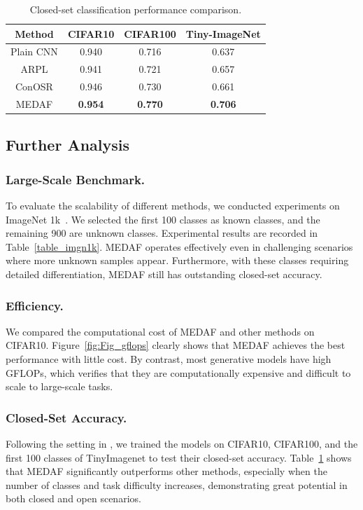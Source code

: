 \documentclass[letterpaper]{article} %
\begin{document}
\begin{table}[t]
\centering
\small
\begin{tabular}{cccc}
\hline
Method & CIFAR10 & CIFAR100 & Tiny-ImageNet \\ \hline
Plain CNN & 0.940 & 0.716 & 0.637 \\
ARPL & 0.941 & 0.721 & 0.657  \\
ConOSR & 0.946 & 0.730 & 0.661 \\  \hline
MEDAF & \textbf{0.954} & \textbf{0.770} & \textbf{0.706}\\ \hline
\end{tabular}
\caption{Closed-set classification performance comparison.}
\label{table_close_acc}
\end{table}

\subsection{Further Analysis}
\subsubsection{Large-Scale Benchmark.}
To evaluate the scalability of different methods, we conducted experiments on ImageNet 1k~\cite{russakovsky2015imagenet}. We selected the first 100 classes as known classes, and the remaining 900 are unknown classes. Experimental results are recorded in Table~\ref{table_imgn1k}. MEDAF operates effectively even in challenging scenarios where more unknown samples appear. Furthermore, with these classes requiring detailed differentiation, MEDAF still has outstanding closed-set accuracy.

\subsubsection{Efficiency.}
We compared the computational cost of MEDAF and other methods on CIFAR10. Figure~\ref{fig:Fig_gflops} clearly shows that MEDAF achieves the best performance with little cost. By contrast, most generative models have high GFLOPs, which verifies that they are computationally expensive and difficult to scale to large-scale tasks.

\subsubsection{Closed-Set Accuracy.}
Following the setting in \cite{xu2023contrastive}, we trained the models on CIFAR10, CIFAR100, and the first 100 classes of TinyImagenet to test their closed-set accuracy. Table~\ref{table_close_acc} shows that MEDAF significantly outperforms other methods, especially when the number of classes and task difficulty increases, demonstrating great potential in both closed and open scenarios.
\end{document}
